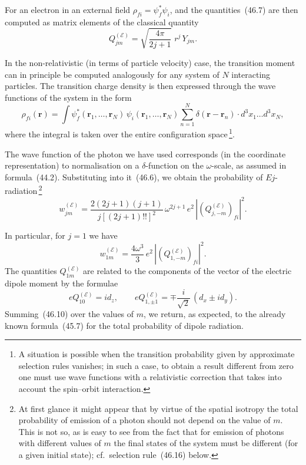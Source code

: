 For an electron in an external field $\rho_{fi} = \psi^*_f\psi_i$, and the quantities~(46.7) are then computed as matrix elements of the classical quantity
\[
Q^{(\mathscr{E})}_{jm} = \sqrt{\frac{4\pi}{2j+1}}\;r^j\,Y_{jm}.
\]

In the non-relativistic (in terms of particle velocity) case, the transition moment can in principle be computed analogously for any system of $N$ interacting particles. The transition charge density is then expressed through the wave functions of the system in the form
\begin{equation}
\rho_{fi}(\mathbf{r}) = \int\psi^*_f(\mathbf{r}_1,\ldots,\mathbf{r}_N)\,\psi_i(\mathbf{r}_1,\ldots,\mathbf{r}_N)\sum_{n=1}^{N}\delta(\mathbf{r} - \mathbf{r}_n)\cdot d^3x_1\ldots d^3x_N,
\tag{46.8}
\end{equation}
where the integral is taken over the entire configuration space\,\footnote{A situation is possible when the transition probability given by approximate selection rules vanishes; in such a case, to obtain a result different from zero one must use wave functions with a relativistic correction that takes into account the spin--orbit interaction.}.

The wave function of the photon we have used corresponds (in the coordinate representation) to normalisation on a $\delta$-function on the $\omega$-scale, as assumed in formula~(44.2). Substituting into it~(46.6), we obtain the probability of $Ej$-radiation\,\footnote{At first glance it might appear that by virtue of the spatial isotropy the total probability of emission of a photon should not depend on the value of $m$. This is not so, as is easy to see from the fact that for emission of photons with different values of $m$ the final states of the system must be different (for a given initial state); cf.\ selection rule~(46.16) below.}
\begin{equation}
w^{(\mathscr{E})}_{jm} = \frac{2(2j+1)(j+1)}{j[(2j+1)!!]^2}\,\omega^{2j+1}\,e^2\,|(Q^{(\mathscr{E})}_{j,-m})_{fi}|^2.
\tag{46.9}
\end{equation}

In particular, for $j = 1$ we have
\begin{equation}
w^{(\mathscr{E})}_{1m} = \frac{4\omega^3}{3}\,e^2\,|(Q^{(\mathscr{E})}_{1,-m})_{fi}|^2.
\tag{46.10}
\end{equation}
The quantities $Q^{(\mathscr{E})}_{1m}$ are related to the components of the vector of the electric dipole moment by the formulae
\begin{equation}
eQ^{(\mathscr{E})}_{10} = id_z,\qquad eQ^{(\mathscr{E})}_{1,\pm 1} = \mp\frac{i}{\sqrt{2}}\,(d_x \pm id_y).
\tag{46.11}
\end{equation}
Summing~(46.10) over the values of $m$, we return, as expected, to the already known formula~(45.7) for the total probability of dipole radiation.

